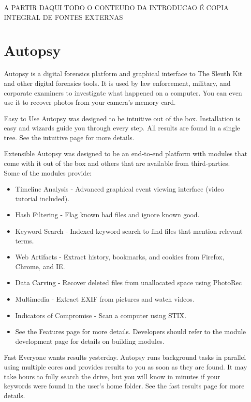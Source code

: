 \begin{center}
A PARTIR DAQUI TODO O CONTEUDO DA INTRODUCAO É COPIA INTEGRAL DE FONTES EXTERNAS
\end{center}

\section{Autopsy}

Autopsy is a digital forensics platform and graphical interface to The Sleuth Kit
and other digital forensics tools. It is used by law enforcement, military, 
and corporate examiners to investigate what happened on a computer. You can even 
use it to recover photos from your camera's memory card.

Easy to Use
Autopsy was designed to be intuitive out of the box. Installation is easy and
wizards guide you through every step. All results are found in a single tree.
See the intuitive page for more details.

Extensible
Autopsy was designed to be an end-to-end platform with modules that come with
it out of the box and others that are available from third-parties. Some of the
modules provide:

\begin{itemize}
\item Timeline Analysis - Advanced graphical event viewing interface (video 
tutorial included).
\item Hash Filtering - Flag known bad files and ignore known good.
\item Keyword Search - Indexed keyword search to find files that mention relevant
terms.
\item Web Artifacts - Extract history, bookmarks, and cookies from Firefox, Chrome,
and IE.
\item Data Carving - Recover deleted files from unallocated space using PhotoRec
\item Multimedia - Extract EXIF from pictures and watch videos.
\item Indicators of Compromise - Scan a computer using STIX.
\item See the Features page for more details. Developers should refer to the
module development page for details on building modules.
\end{itemize}

Fast
Everyone wants results yesterday. Autopsy runs background tasks in parallel using multiple cores and provides results to you as soon as they are found. It may take hours to fully search the drive, but you will know in minutes if your keywords were found in the user's home folder. See the fast results page for more details.

